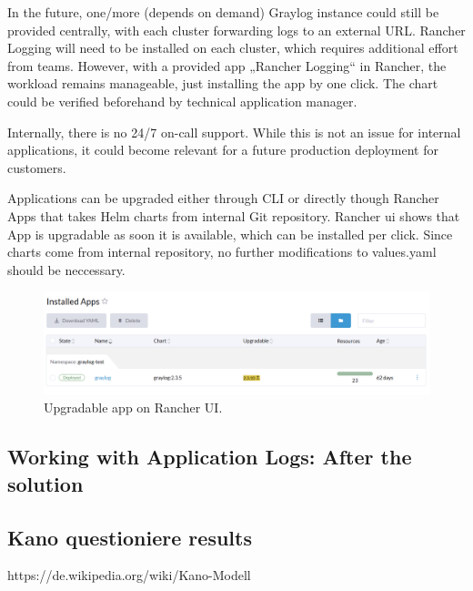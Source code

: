 \documentclass[../main.tex]{subfiles}
\begin{document}
In the future, one/more (depends on demand) Graylog instance could still be provided centrally, with each cluster forwarding logs to an external URL. Rancher Logging will need to be installed on each cluster, which requires additional effort from teams. However, with a provided app „Rancher Logging“ in Rancher, the workload remains manageable, just installing the app by one click. The chart could be verified beforehand by technical application manager.

Internally, there is no 24/7 on-call support. While this is not an issue for internal applications, it could become relevant for a future production deployment for customers.

Applications can be upgraded either through CLI or directly though Rancher Apps that takes Helm charts from internal Git repository. Rancher \gls{ui} shows that App is upgradable as soon it is available, which can be installed per click. Since charts come from internal repository, no further modifications to values.yaml should be neccessary.

\begin{figure}[H]
        \centering
        \includegraphics[scale=0.6]{img/3-background/rancher/rancher_update_graylog.png}
        \caption{Upgradable app on Rancher UI.}
        \label{fig:rancher_update_graylog}
\end{figure}

\subsection{Working with Application Logs: After the solution}

\subsection{Kano questioniere results}

https://de.wikipedia.org/wiki/Kano-Modell
\end{document}
